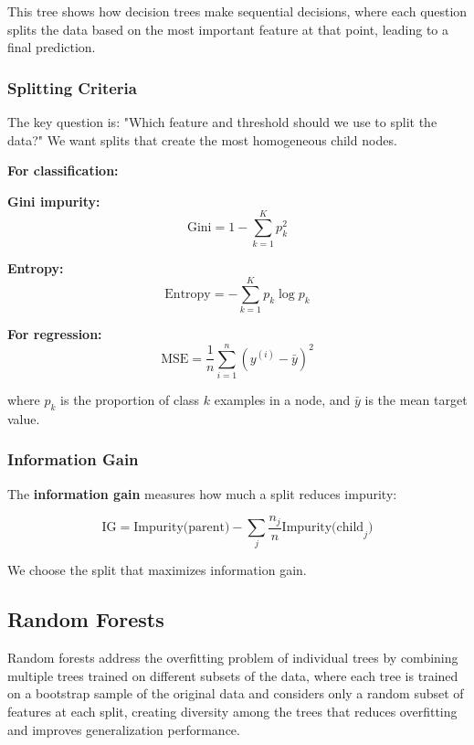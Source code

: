 \begin{example}
This tree shows how decision trees make sequential decisions, where each question splits the data based on the most important feature at that point, leading to a final prediction.
\end{example}

\subsubsection{Splitting Criteria}

The key question is: "Which feature and threshold should we use to split the data?" We want splits that create the most homogeneous child nodes.

\textbf{For classification:}

\textbf{Gini impurity:}
\begin{equation}
\text{Gini} = 1 - \sum_{k=1}^{K} p_k^2
\end{equation}

\textbf{Entropy:}
\begin{equation}
\text{Entropy} = -\sum_{k=1}^{K} p_k \log p_k
\end{equation}

\textbf{For regression:}
\begin{equation}
\text{MSE} = \frac{1}{n} \sum_{i=1}^{n} (y^{(i)} - \bar{y})^2
\end{equation}

where $p_k$ is the proportion of class $k$ examples in a node, and $\bar{y}$ is the mean target value.

\subsubsection{Information Gain}

The \textbf{information gain} measures how much a split reduces impurity:

\begin{equation}
\text{IG} = \text{Impurity(parent)} - \sum_{j} \frac{n_j}{n} \text{Impurity(child}_j\text{)}
\end{equation}

We choose the split that maximizes information gain.

\subsection{Random Forests}

Random forests address the overfitting problem of individual trees by combining multiple trees trained on different subsets of the data, where each tree is trained on a bootstrap sample of the original data and considers only a random subset of features at each split, creating diversity among the trees that reduces overfitting and improves generalization performance.

